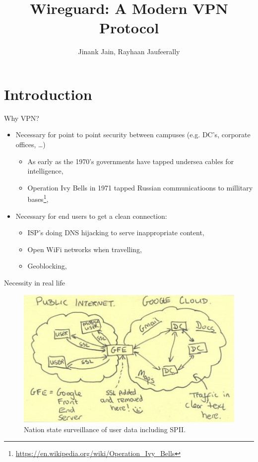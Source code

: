\documentclass[xcolor=table]{beamer}
\title{Wireguard: A Modern VPN Protocol}
\author{Jinank Jain, Rayhaan Jaufeerally}
\institute{Network Security Group, ETH Z\"urich}
\begin{document}
    \maketitle
    \section{Introduction}
    \begin{frame}{Why VPN?}
        \begin{itemize}
            \item Necessary for point to point security between campuses (e.g. DC's, corporate offices, \ldots)
                \begin{itemize}
                    \item As early as the 1970's governments have tapped undersea cables for intelligence,
                    \item Operation Ivy Bells in 1971 tapped Russian communicatioons to millitary bases\footnote{\url{https://en.wikipedia.org/wiki/Operation\_Ivy\_Bells}},
                \end{itemize}
            \item Necessary for end users to get a clean connection:
                \begin{itemize}
                    \item ISP's doing DNS hijacking to serve inappropriate content,
                    \item Open WiFi networks when travelling,
                    \item Geoblocking,
                \end{itemize}
        \end{itemize}
    \end{frame}
    \begin{frame}{Necessity in real life}
        \begin{figure}
            \includegraphics[width=\textwidth]{motivation.jpg}
            \caption{Nation state surveillance of user data including SPII.}
        \end{figure}
    \end{frame}
\end{document}
